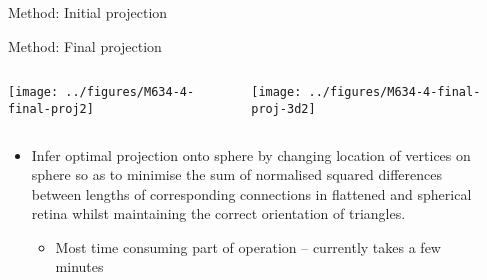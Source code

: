 \documentclass[final,hyperref={pdfpagelabels=false}]{beamer}
\begin{document}
\begin{frame}{}
\begin{columns}[T]
\begin{column}{.33\linewidth}
\begin{block}{Method: Initial projection}
      \end{block}

      \begin{block}{Method: Final projection}
        \begin{columns}
          \begin{column}{0.35\linewidth}
            \texttt{[image: ../figures/M634-4-final-proj2]}
          \end{column}
          \begin{column}{0.5\linewidth}
            \texttt{[image: ../figures/M634-4-final-proj-3d2]}


          \end{column}
        \end{columns}

            \begin{itemize}
            \item Infer optimal projection onto sphere by changing
              location of vertices on sphere so as to minimise the sum
              of normalised squared differences between lengths of
              corresponding connections in flattened and spherical
              retina whilst maintaining the correct orientation of
              triangles.
              \begin{itemize}
              \item Most time consuming part of operation -- currently
                takes a few minutes
              \end{itemize}
            \end{itemize}

      \end{block}
    \end{column}

    \begin{column}{.33\linewidth}


\end{column}
\end{columns}
\end{frame}
\end{document}
